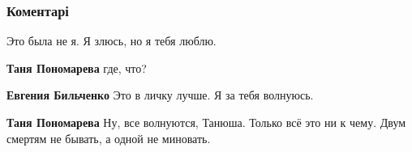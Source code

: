  
 
 
 
 
\subsubsection{Коментарі}
\label{sec:01_08_2021.fb.bilchenko_evgenia.3.svoji.cmt}

\begin{itemize}
 
Это была не я. Я злюсь, но я тебя люблю.
\begin{itemize}
 
\textbf{Таня Пономарева} где, что?

 
\textbf{Евгения Бильченко} Это в личку лучше. Я за тебя волнуюсь.

 
\textbf{Таня Пономарева} Ну, все волнуются, Танюша. Только всё это ни к чему. Двум смертям не бывать, а одной не миновать.

 

\end{itemize}
\end{itemize}
